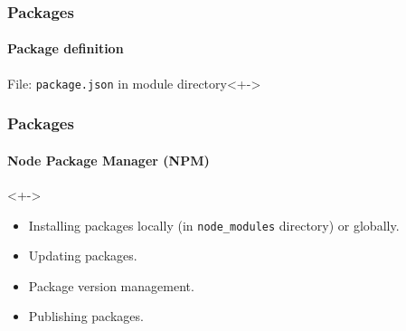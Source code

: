 \begin{frame}
	\frametitle{Packages}
	\framesubtitle{Package definition}

	\begin{block}{File: \texttt{package.json} in module directory}<+->
		
	\end{block}
\end{frame}


\begin{frame}
	\frametitle{Packages}
	\framesubtitle{Node Package Manager (NPM)}

	\begin{block}{}<+->
		\begin{itemize}[<+-| highlight@+>]
			\item Installing packages locally (in \texttt{node\_modules} directory) or globally.
			\item Updating packages.
			\item Package version management.
			\item Publishing packages.
		\end{itemize}
	\end{block}
\end{frame}


